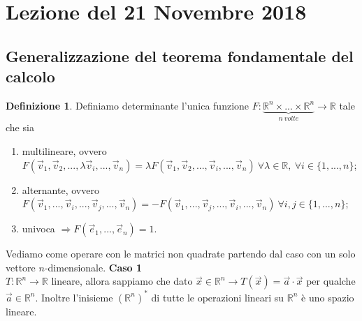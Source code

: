 \documentclass[10pt]{article}
\theoremstyle{plain}
\theoremstyle{definition}
\newtheorem{defn}{Definizione}
\begin{document}
\section{Lezione del 21 Novembre 2018}
\subsection{Generalizzazione del teorema fondamentale del calcolo}
\begin{defn}
Definiamo determinante l'unica funzione $F:\underbrace{\mathbb{R}^n\times ... \times\mathbb{R}^n}_{n\ volte}\to \mathbb{R}$ tale che sia
\begin{enumerate}
    \item multilineare, ovvero $F(\vec{v}_1,\vec{v}_2,...,\lambda\vec{v}_i,..., \vec{v}_n)=\lambda F(\vec{v}_1,\vec{v}_2,...,\vec{v}_i,..., \vec{v}_n)\ \forall \lambda\in \mathbb{R},\ \forall i\in\{1,...,n \}$;
    \item alternante, ovvero $F(\vec{v}_1,...,\vec{v}_i,...,\vec{v}_j,..., \vec{v}_n)=-F(\vec{v}_1,...,\vec{v}_j,...,\vec{v}_i,..., \vec{v}_n)\  \forall i,j\in\{1,...,n \}$;
    \item univoca $\Rightarrow F(\vec{e}_1,..., \vec{e}_n)=1$.
\end{enumerate}
\end{defn}
Vediamo come operare con le matrici non quadrate partendo dal caso con un solo vettore $n$-dimensionale.
\textbf{Caso 1}
\\ $T:\mathbb{R}^n\to \mathbb{R}$ lineare, allora sappiamo che dato $\vec{x}\in \mathbb{R}^n\to T(\vec{x})=\vec{a}\cdot \vec{x}$ per qualche $\vec{a}\in \mathbb{R}^n$. Inoltre l'inisieme $(\mathbb{R}^n)^*$ di tutte le operazioni lineari su $\mathbb{R}^n$ è uno spazio lineare.
\end{document}
